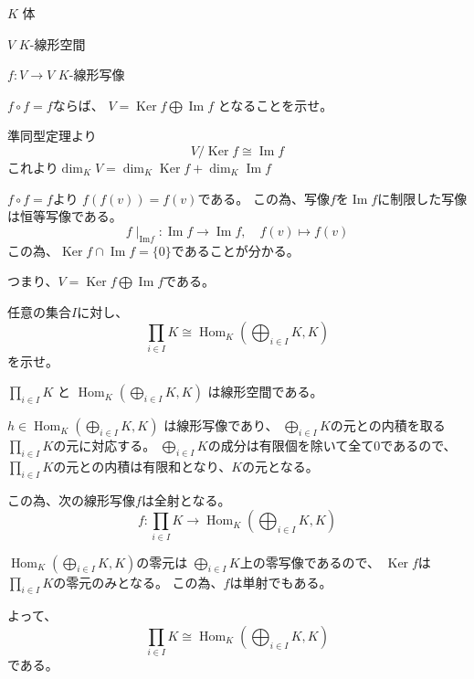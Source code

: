 \documentclass[12pt,b5paper]{ltjsarticle}
\newcommand{\Img}{\mathop{\mathrm{Im}}\nolimits}
\newcommand{\Ker}{\mathop{\mathrm{Ker}}\nolimits}
\newcommand{\Hom}{\mathop{\mathrm{Hom}}\nolimits}
\begin{document}
\hrulefill

$K$ \quad 体

$V$ \quad $K$-線形空間

$f:V\to V$ \quad $K$-線形写像

\hrulefill

$f\circ f=f$ならば、
$V=\Ker f\bigoplus \Img f$
となることを示せ。

\dotfill

準同型定理より
\begin{equation}
 V / \Ker f \cong \Img f
\end{equation}
これより$\dim_K V = \dim_K \Ker f + \dim_K \Img f$

$f\circ f = f$より
$f(f(v))=f(v)$である。
この為、写像$f$を$\Img f$に制限した写像は恒等写像である。
\begin{equation}
 f\mid_{\mathrm{Im}f}: \Img f \to \Img f , \quad f(v) \mapsto f(v)
\end{equation}
この為、$\Ker f \cap \Img f = \{0\}$であることが分かる。

つまり、$V=\Ker f\bigoplus \Img f$である。


\hrulefill

任意の集合$I$に対し、
\begin{equation}
 \prod_{i\in I}K \cong \Hom_{K}(\bigoplus_{i\in I}K, K)
\end{equation}
を示せ。

\dotfill

$\prod_{i\in I}K$
と
$\Hom_{K}(\bigoplus_{i\in I}K, K)$
は線形空間である。

$h\in \Hom_{K}(\bigoplus_{i\in I}K, K)$
は線形写像であり、
$\bigoplus_{i\in I}K$の元との内積を取る
$\prod_{i\in I}K$の元に対応する。
$\bigoplus_{i\in I}K$の成分は有限個を除いて全て$0$であるので、
$\prod_{i\in I}K$の元との内積は有限和となり、$K$の元となる。

この為、次の線形写像$f$は全射となる。
\begin{equation}
 f:\prod_{i\in I}K \to \Hom_{K}(\bigoplus_{i\in I}K, K)
\end{equation}

$\Hom_{K}(\bigoplus_{i\in I}K, K)$の零元は
$\bigoplus_{i\in I}K$上の零写像であるので、
$\Ker f$は$\prod_{i\in I}K$の零元のみとなる。
この為、$f$は単射でもある。

よって、
\begin{equation}
 \prod_{i\in I}K \cong \Hom_{K}(\bigoplus_{i\in I}K, K)
\end{equation}
である。

\hrulefill
\end{document}
